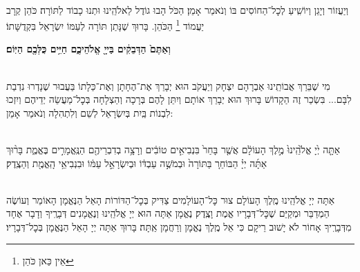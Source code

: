 \documentclass[twoside, openany, parskip=half, 11pt]{book}
\begin{document}
\avharachamim

\\
וְיַעֲזוֹר וְיָגֵן וְיוֹשִֽׁיעַ לְכׇל־הַחוֹסִים בּוֹ וְנֹאמַר אָמֵן׃
הַכֹּל הָבוּ גוֹדֶל לֵאלֹהֵֽינוּ וּתְנוּ כָבוֹד לַתּוֹרָה׃ כֹּהֵן קְרָב יַעֲמוֹד
\footnote{ אֵין כַּאן כֹּהֵן}
הַכֹּהֵן. בָּרוּךְ שֶׁנָּתַן תּוֹרָה לְעַמּוֹ יִשְׂרָאֵל בִּקְדֻשָּׁתוֹ׃

\textbf{וְאַתֶּם֙ הַדְּבֵקִ֔ים בַּייָ֖ אֱלֹהֵיכֶ֑ם חַיִּ֥ים כֻּלְּכֶ֖ם הַיּֽוֹם׃} 

\torahbarachu

\hagomel




\begin{sometimes}

\misheberakhbaby

\misheberakhbarmitzva

\\
מִי שֶׁבֵּרַךְ אֲבוֹתֵֽינוּ אַבְרָהָם יִצְחָק וְיַעֲקֹב הוּא יְבָרֵךְ אֶת־הֶחָתָן  וְאֶת־כַּלָתוֹ  בַּעֲבוּר שֶׁנָדְרוּ נִדְבַת לִבָּם... בִּשְׂכַר זֶה הַקָדוֹשׁ בָּרוּךְ הוּא יְבָרֵךְ אוֹתָם וְיִתֵּן לָהֶם בְּרָכָה וְהַצְלָחָה בְּכׇל־מַעֲשֵׂה יְדֵיהֶם וְיִזְכוּ לִבְנוֹת בַּֽיִת בְּיִשְׂרָאֵל לְשֵׁם וְלִתְהִלָה וְנֹאמַר אָמֵן:



\end{sometimes}

\halfkaddish

\hagbaha
\newpage
{}

\\
אַתָּ֤ה יְ֙יָ אֱלֹ֙הֵֽינוּ֙ מֶ֣לֶךְ הָעוֹלָ֔ם אֲשֶׁ֤ר בָּחַר֙ בִּנְבִיאִ֣ים טוֹבִ֔ים וְרָצָ֥ה בְדִבְרֵיהֶ֖ם הַנֶּֽאֱמָרִ֣ים בֶּאֱמֶ֑ת בָּר֨וּךְ אַתָּ֜ה יְיָ֗ הַבּוֹחֵר֚ בַּתּוֹרָה֙ וּבְמֹשֶׁ֣ה עַבְדּ֔וֹ וּבְיִשְׂרָאֵ֣ל עַמּ֔וֹ וּבִנְבִיאֵ֥י הָֽאֱמֶ֖ת וְהַצֶֽדֶק׃

\\
אַתָּה יְיָ אֱלֹהֵֽינוּ מֶֽלֶךְ הָעוֹלָם צוּר כׇּל־הָעוֹלָמִים צַדִּיק בְּכׇל־הַדּוֹרוֹת הָאֵל הַנֶּאֱמָן הָאוֹמֵר וְעוֹשֶׂה הַמְדַבֵּר וּמְקַיֵּם שֶׁכׇּל־דְּבָרָיו אֱמֶת וָצֶֽדֶק׃ נֶאֱמָן אַתָּה הוּא יְיָ אֱלֹהֵֽינוּ וְנֶאֱמָנִים דְּבָרֶֽיךָ וְדָבָר אֶחָד מִדְּבָרֶֽיךָ אָחוֹר לֹא יָשׁוּב רֵיקָם כִּי אֵל מֶֽלֶךְ נֶאֱמָן וְרַחֲמָן אַֽתָּה׃ בָּרוּךְ אַתָּה יְיָ הָאֵל הַנֶּאֱמָן בְּכׇל־דְּבָרָיו׃
\end{document}
